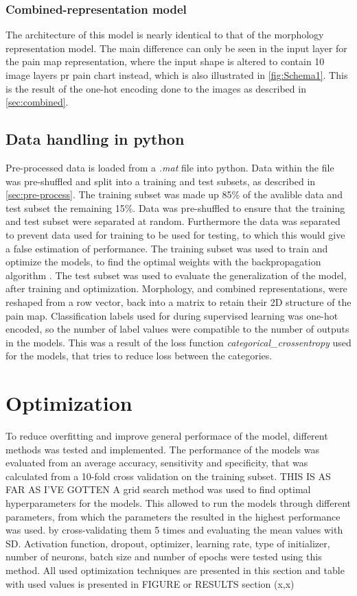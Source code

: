 \subsubsection{Combined-representation model}
The architecture of this model is nearly identical to that of the morphology representation model. 
The main difference can only be seen in the input layer for the pain map representation, where the input shape is altered to contain 10 image layers pr pain chart instead, which is also illustrated in \autoref{fig:Schema1}. This is the result of the one-hot encoding done to the images as described in \ref{sec:combined}. 


\subsection{Data handling in python}
Pre-processed data is loaded from a \textit{.mat} file into python.
Data within the file was pre-shuffled and split into a training and test subsets, as described in \autoref{sec:pre-process}. The training subset was made up 85\% of the avalible data and test subset the remaining 15\%. Data was pre-shuffled to ensure that the training and test subset were separated at random. Furthermore the data was separated to prevent data used for training to be used for testing, to which this would give a false estimation of performance.  
The training subset was used to train and optimize the models, to find the optimal weights with the backpropagation algorithm \citep{Bengio2012}. 
The test subset was used to evaluate the generalization of the model, after training and optimization.
Morphology, and combined representations, were reshaped from a row vector, back into a matrix to retain their 2D structure of the pain map.
Classification labels used for during supervised learning was one-hot encoded, so the number of label values were compatible to the number of outputs in the models. This was a result of the loss function \textit{categorical\_crossentropy} used for the models, that tries to reduce loss between the categories.    


\section{Optimization}
To reduce overfitting and improve general performace of the model, different methods was tested and implemented. 
The performance of the models was evaluated from an average accuracy, sensitivity and specificity, that was calculated from a 10-fold cross validation on the training subset. 
THIS IS AS FAR AS I'VE GOTTEN
A grid search method was used to find optimal hyperparameters for the models. This allowed to run the models through different parameters, from which the parameters the resulted in the highest performance was used.  by cross-validating them 5 times and evaluating the mean values with SD. Activation function, dropout, optimizer, learning rate, type of initializer, number of neurons, batch size and number of epochs were tested using this method.  All used optimization techniques are presented in this section and table with used values is presented in FIGURE or RESULTS section (x,x)

